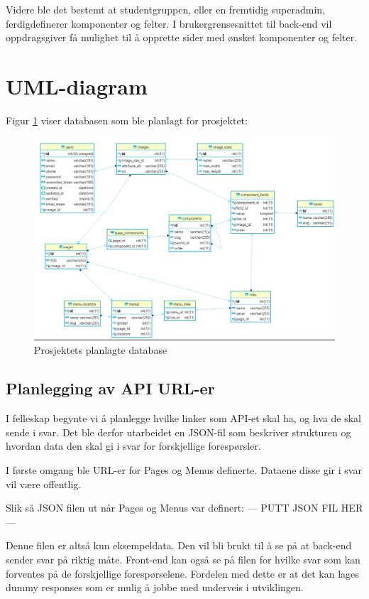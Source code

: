 Videre ble det bestemt at studentgruppen, eller en fremtidig superadmin, ferdigdefinerer komponenter og felter. I brukergrensesnittet til back-end vil oppdragsgiver få mulighet til å opprette sider med ønsket komponenter og felter.  


\section{UML-diagram}
Figur \ref{fig:database} viser databasen som ble planlagt for prosjektet:
\begin{figure}[H]
    \centering
    \includegraphics[width=\textwidth]{planlegging-av-database.png}
    \caption{Prosjektets planlagte database}
    \label{fig:database}
\end{figure}


\subsection{Planlegging av API URL-er}
I felleskap begynte vi å planlegge hvilke linker som API-et skal ha, og hva de skal sende i svar. Det ble derfor utarbeidet en JSON-fil som beskriver strukturen og hvordan data den skal gi i svar for forskjellige forespørsler.

I første omgang ble URL-er for Pages og Menus definerte. Dataene disse gir i svar vil være offentlig. 

Slik så JSON filen ut når Pages og Menus var definert:
--- PUTT JSON FIL HER ---

Denne filen er altså kun eksempeldata. Den vil bli brukt til å se på at back-end sender svar på riktig måte. Front-end kan også se på filen for hvilke svar som kan forventes på de forskjellige forespørselene. Fordelen med dette er at det kan lages dummy responses som er mulig å jobbe med underveis i utviklingen.



